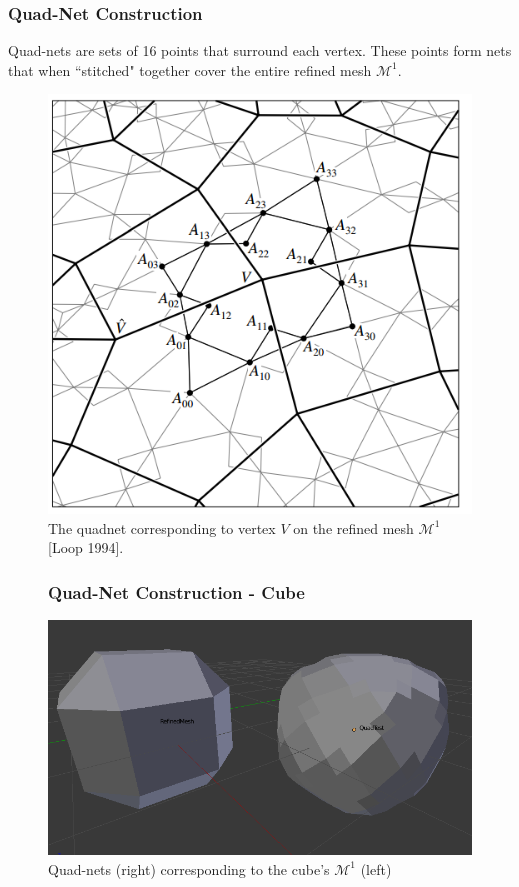 \documentclass[11pt]{beamer}
\begin{document}
	\begin{frame}
		\frametitle{Quad-Net Construction}
		Quad-nets are sets of 16 points that surround each vertex. These points form nets that when ``stitched" together cover the entire refined mesh $\mathcal{M}^1$. 
	
		\begin{figure}[bp!]
			\centering			
			\includegraphics[width=.5\linewidth]{img/loop_quad_net}
			\caption{The quadnet corresponding to vertex $V$ on the refined mesh $\mathcal{M}^1$ [Loop 1994].}			
		\end{figure} 	
	\end{frame}

	\begin{frame}
		\begin{figure}[bp!]
			\frametitle{Quad-Net Construction - Cube}
			\centering
			\includegraphics[width=.8\linewidth]{img/quad_cube}
			\caption{Quad-nets (right) corresponding to the cube's $\mathcal{M}^1$ (left)}	
		\end{figure}
	\end{frame}	
	
\end{document}
